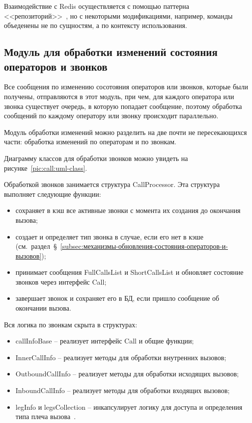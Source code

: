 Взаимодействие с Redis осуществляется с помощью паттерна <<репозиторий>>~\cite{RepositoryDesignPattern},
но с некоторыми модификациями, например, команды объеденены не по сущностям, а по контексту использования.

\subsection{Модуль для обработки изменений состояния операторов и звонков}\label{subsec:модуль-для-обработки-изменений-состояния-операторов-и-звонков}

Все сообщения по изменению сосотояния операторов или звонков, которые были получены,
отправляются в этот модуль, при чем,
для каждого оператора или звонка существует очередь, в которую попадает сообщение,
поэтому обработка сообщений по каждому оператору или звонку происходит параллельно.

Модуль обработки изменений можно разделить на две почти не пересекающихся части: обработка изменений по операторам и по звонкам.

Диаграмму классов для обработки звонков можно увидеть на рисунке~\ref{pic:call:uml-class}.


Обработкой звонков занимается структура CallProcessor.
Эта структура выполняет следующие функции:
\begin{itemize}
    \item сохраняет в кэш все активные звонки с момента их создания до окончания вызова;
    \item создает и определяет тип звонка в случае, если его нет в кэше (см.~раздел~\S~\ref{subsec:механизмы-обновления-состояния-операторов-и-вызовов});
    \item принимает сообщения FullCallsList и ShortCallsList и обновляет состояние звонков через интерфейс Call;
    \item завершает звонок и сохраняет его в БД, если пришло сообщение об окончании вызова.
\end{itemize}

Вся логика по звонкам скрыта в структурах:
\begin{itemize}
    \item callInfoBase -- реализует интерфейс Call и общие функции;
    \item InnerCallInfo -- реализует методы для обработки внутренних вызовов;
    \item OutboundCallInfo -- реализует методы для обработки исходящих вызовов;
    \item InboundCallInfo -- реализует методы для обработки входящих вызовов;
    \item legInfo и legsCollection -- инкапсулирует логику для доступа и определения типа плеча вызова~\cite{doc:Call_Structure}.
\end{itemize}

